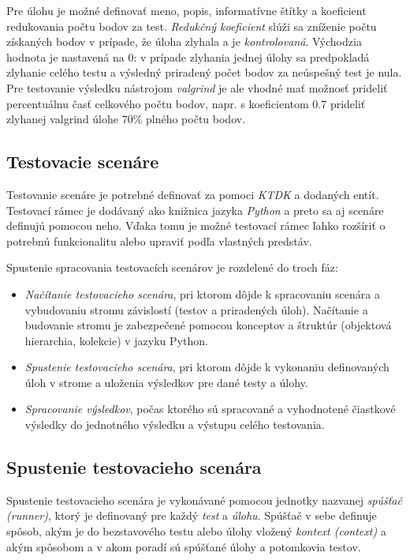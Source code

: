 \documentclass[
  digital, %
  twoside, %
  table,   %
  lof,     %
  lot,     %
]{fithesis3}
\begin{document}
Pre úlohu je možné definovať meno, popis, informatívne štítky a koeficient redukovania počtu bodov za test. \emph{Redukčný koeficient} slúži sa zníženie počtu získaných bodov v prípade, že úloha zlyhala a je \emph{kontrolovaná}. Východzia hodnota je nastavená na 0: v prípade zlyhania jednej úlohy sa predpokladá zlyhanie celého testu a výsledný priradený počet bodov za neúspešný test je nula. Pre testovanie výsledku nástrojom \emph{valgrind} je ale vhodné mať možnosť prideliť percentuálnu časť celkového počtu bodov, napr. s koeficientom 0.7 prideliť zlyhanej valgrind úlohe 70\% plného počtu bodov.

\subsection{Testovacie scenáre}

Testovanie scenáre je potrebné definovať za pomoci \emph{KTDK} a dodaných entít. Testovací rámec je dodávaný ako knižnica jazyka \emph{Python} a preto sa aj scenáre definujú pomocou neho. Vďaka tomu je možné testovací rámec ľahko rozšíriť o potrebnú funkcionalitu alebo upraviť podľa vlastných predstáv. 

Spustenie spracovania testovacích scenárov je rozdelené do troch fáz:
\begin{itemize}
    \item \emph{Načítanie testovacieho scenára}, pri ktorom dôjde k spracovaniu scenára a vybudovaniu stromu závislostí (testov a priradených úloh). Načítanie a budovanie stromu je zabezpečené pomocou konceptov a štruktúr (objektová hierarchia, kolekcie) v jazyku Python.
    \item \emph{Spustenie testovacieho scenára}, pri ktorom dôjde k vykonaniu definovaných úloh v strome a uloženia výsledkov pre dané testy a úlohy.
    \item \emph{Spracovanie výsledkov}, počas ktorého sú spracované a vyhodnotené čiastkové výsledky do jednotného výsledku a výstupu celého testovania.
\end{itemize}

\subsection{Spustenie testovacieho scenára}

Spustenie testovacieho scenára je vykonávané pomocou jednotky nazvanej \emph{spúšťač (runner)}, ktorý je definovaný pre každý \emph{test} a \emph{úlohu}. Spúšťač v sebe definuje spôsob, akým je do bezstavového testu alebo úlohy vložený \emph{kontext (context)} a akým spôsobom a v akom poradí sú spúšťané úlohy a potomkovia testov. 
\end{document}
